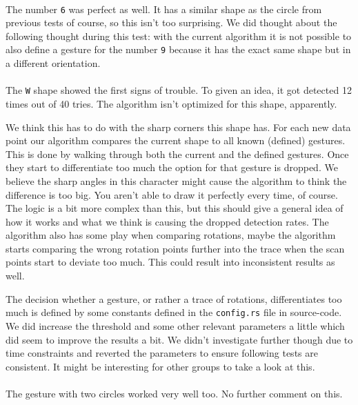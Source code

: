 \documentclass[a4paper]{article}
\begin{document}
  \paragraph{}
  The number \verb_6_ was perfect as well. It has a similar shape as the circle
  from previous tests of course, so this isn't too surprising.
  We did thought about the following thought during this test: with the current
  algorithm it is not possible to also define a gesture for the number \verb_9_
  because it has the exact same shape but in a different orientation.

  \paragraph{}
  The \verb_W_ shape showed the first signs of trouble. To given an idea, it got
  detected 12 times out of 40 tries. The algorithm isn't optimized for this
  shape, apparently.

  We think this has to do with the sharp corners this shape
  has. For each new data point our algorithm compares the current shape to all
  known (defined) gestures. This is done by walking through both the current and
  the defined gestures. Once they start to differentiate too much the option for
  that gesture is dropped. We believe the sharp angles in this character might
  cause the algorithm to think the difference is too big. You aren't able to
  draw it perfectly every time, of course. The logic is a bit more complex than
  this, but this should give a general idea of how it works and what we think is
  causing the dropped detection rates. The algorithm also has some play when
  comparing rotations, maybe the algorithm starts comparing the wrong rotation
  points further into the trace when the scan points start to deviate too much.
  This could result into inconsistent results as well.

  The decision whether a gesture, or rather a trace of rotations, differentiates
  too much is defined by some constants defined in the \verb_config.rs_ file in
  source-code. We did increase the threshold and some other relevant parameters
  a little which did seem to improve the results a bit. We didn't investigate
  further though due to time constraints and reverted the parameters to ensure
  following tests are consistent. It might be interesting for other groups to
  take a look at this.

  \paragraph{}
  The gesture with two circles worked very well too. No further comment on this.
\end{document}
